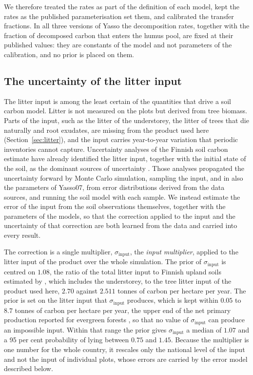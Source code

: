 \documentclass[11pt]{article}
\newcommand{\sinput}{\sigma_{\mathrm{input}}}
\begin{document}
We therefore treated the rates as part of the definition of each model, kept the rates as the published parameterisation set them, and calibrated the transfer fractions. In all three versions of Yasso the decomposition rates, together with the
fraction of decomposed carbon that enters the humus pool, are fixed at their published
values: they are constants of the model and not parameters of the calibration, and no prior
is placed on them.

\subsection{The uncertainty of the litter input}\label{sec:inputunc}

The litter input is among the least certain of the quantities that drive a soil carbon model.
Litter is not measured on the plots but derived from tree biomass. Parts of the input, such as
the litter of the understorey, the litter of trees that die naturally and root exudates, are
missing from the product used here (Section~\ref{sec:litter}), and the input carries
year-to-year variation that periodic inventories cannot capture. Uncertainty analyses of the Finnish soil carbon estimate
have already identified the litter input, together with the initial state of the soil, as the dominant
sources of uncertainty \citep{Peltoniemi2006,LehtonenHeikkinen2015}. Those analyses propagated
the uncertainty forward by Monte Carlo simulation, sampling the input, and in
\citet{LehtonenHeikkinen2015} also the parameters of Yasso07, from error distributions derived
from the data sources, and running the soil model with each sample.
We instead estimate the error of the input from the soil
observations themselves, together with the parameters of the models, so that the correction
applied to the input and the uncertainty of that correction are both learned from the data
and carried into every result.

The correction is a single multiplier, $\sinput$, the \emph{input multiplier}, applied to the
litter input of the product over the whole simulation. The prior of $\sinput$ is centred on
$1.08$, the ratio of the total litter input to Finnish upland soils estimated by
\citet{LehtonenHeikkinen2015}, which includes the understorey, to the tree litter input of the
product used here, $2.70$ against $2.511$ tonnes of carbon per hectare per year. The prior is
set on the litter input that $\sinput$ produces, which is kept within $0.05$ to $8.7$ tonnes of
carbon per hectare per year, the upper end of the net primary production reported for evergreen
forests \citep{Gower2001}, so that no value of $\sinput$ can produce an impossible input. Within
that range the prior gives $\sinput$ a median of $1.07$ and a 95 per cent probability of lying
between $0.75$ and $1.45$. Because the multiplier is one number for the whole country, it
rescales only the national level of the input and not the input of individual plots, whose errors
are carried by the error model described below.
\end{document}
